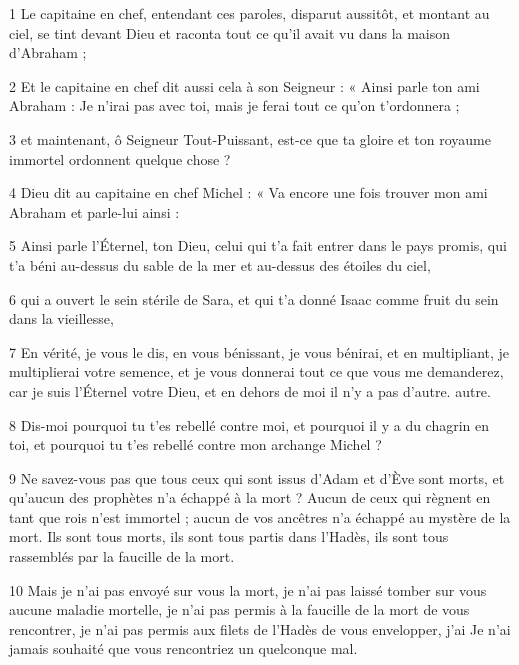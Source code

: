 
\par 1 Le capitaine en chef, entendant ces paroles, disparut aussitôt, et montant au ciel, se tint devant Dieu et raconta tout ce qu'il avait vu dans la maison d'Abraham ;

\par 2 Et le capitaine en chef dit aussi cela à son Seigneur : « Ainsi parle ton ami Abraham : Je n'irai pas avec toi, mais je ferai tout ce qu'on t'ordonnera ;

\par 3 et maintenant, ô Seigneur Tout-Puissant, est-ce que ta gloire et ton royaume immortel ordonnent quelque chose ?

\par 4 Dieu dit au capitaine en chef Michel : « Va encore une fois trouver mon ami Abraham et parle-lui ainsi :

\par 5 Ainsi parle l'Éternel, ton Dieu, celui qui t'a fait entrer dans le pays promis, qui t'a béni au-dessus du sable de la mer et au-dessus des étoiles du ciel,

\par 6 qui a ouvert le sein stérile de Sara, et qui t'a donné Isaac comme fruit du sein dans la vieillesse,

\par 7 En vérité, je vous le dis, en vous bénissant, je vous bénirai, et en multipliant, je multiplierai votre semence, et je vous donnerai tout ce que vous me demanderez, car je suis l'Éternel votre Dieu, et en dehors de moi il n'y a pas d'autre. autre.

\par 8 Dis-moi pourquoi tu t'es rebellé contre moi, et pourquoi il y a du chagrin en toi, et pourquoi tu t'es rebellé contre mon archange Michel ?

\par 9 Ne savez-vous pas que tous ceux qui sont issus d'Adam et d'Ève sont morts, et qu'aucun des prophètes n'a échappé à la mort ? Aucun de ceux qui règnent en tant que rois n’est immortel ; aucun de vos ancêtres n’a échappé au mystère de la mort. Ils sont tous morts, ils sont tous partis dans l’Hadès, ils sont tous rassemblés par la faucille de la mort.

\par 10 Mais je n'ai pas envoyé sur vous la mort, je n'ai pas laissé tomber sur vous aucune maladie mortelle, je n'ai pas permis à la faucille de la mort de vous rencontrer, je n'ai pas permis aux filets de l'Hadès de vous envelopper, j'ai Je n'ai jamais souhaité que vous rencontriez un quelconque mal.

